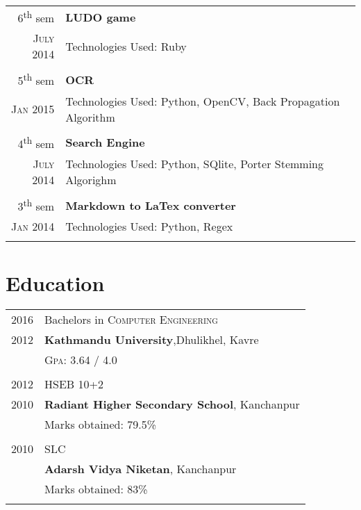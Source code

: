 \documentclass[a4paper,10pt]{article}
\begin{document}
\begin{tabular}{r|p{11cm}}
6\textsuperscript{th} sem & \textbf{LUDO game}\\ \textsc{July 2014} & \small{{Technologies Used: Ruby}}\\\multicolumn{2}{c}{} \\

5\textsuperscript{th} sem & \textbf{OCR}\\ \textsc{Jan 2015} & \small{{Technologies Used: Python, OpenCV, Back Propagation Algorithm}}\\\multicolumn{2}{c}{} \\

4\textsuperscript{th} sem & \textbf{Search Engine}\\ \textsc{July 2014} & \small{Technologies Used: Python, SQlite, Porter Stemming Algorighm}\\\multicolumn{2}{c}{} \\

3\textsuperscript{th} sem & \textbf{Markdown to LaTex converter}\\ \textsc{Jan 2014} & \small{Technologies Used: Python, Regex}\\\multicolumn{2}{c}{} \\
\end{tabular}


\section{Education}
\begin{tabular}{rl}	
2016  & Bachelors in \textsc{Computer Engineering}\\
2012 & \textbf{Kathmandu University},Dhulikhel, Kavre\\
& \normalsize \textsc{Gpa}: 3.64 / 4.0\\\\
2012 & HSEB 10+2 \\ 
2010 &\normalsize\textbf{Radiant Higher Secondary School}, Kanchanpur\\
&Marks obtained: 79.5\%\\&\\
2010& SLC\\ & \textbf{Adarsh Vidya Niketan}, Kanchanpur\\
&Marks obtained: 83\%\\&\\
\end{tabular}
\end{document}
